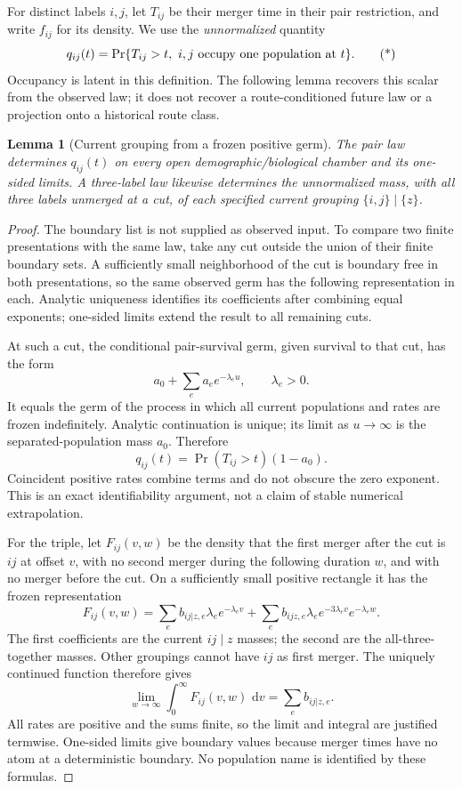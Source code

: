 \documentclass[11pt]{article}
\newtheorem{lemma}[theorem]{Lemma}
\newcommand{\dd}{\,\mathrm d}
\begin{document}
For distinct labels $i,j$, let $T_{ij}$ be their merger time in their pair
restriction, and write $f_{ij}$ for its density.  We use the
\emph{unnormalized} quantity
\[
 q_{ij}(t)=\Pr\{T_{ij}>t,\ i,j\hbox{ occupy one population at }t\}.
 \tag{*}\label{eq:current-q}
\]
Occupancy is latent in this definition.  The following lemma recovers this
scalar from the observed law; it does not recover a route-conditioned future
law or a projection onto a historical route class.

\begin{lemma}[Current grouping from a frozen positive germ]
\label{lem:frozen-grouping}
The pair law determines $q_{ij}(t)$ on every open demographic/biological
chamber and its one-sided limits.  A three-label law likewise determines the
unnormalized mass, with all three labels unmerged at a cut, of each specified
current grouping $\{i,j\}\mid\{z\}$.
\end{lemma}
\begin{proof}
The boundary list is not supplied as observed input. To compare two finite presentations with the same law, take any cut outside the union of their finite boundary sets. A sufficiently small neighborhood of the cut is boundary free in both presentations, so the same observed germ has the following representation in each. Analytic uniqueness identifies its coefficients after combining equal exponents; one-sided limits extend the result to all remaining cuts.

At such a cut, the conditional pair-survival germ, given survival to that cut, has the form
\[
 a_0+\sum_e a_e e^{-\lambda_e u},\qquad \lambda_e>0.
\]
It equals the germ of the process in which all current populations and rates
are frozen indefinitely.  Analytic continuation is unique; its limit as
$u\to\infty$ is the separated-population mass $a_0$.  Therefore
\[
 q_{ij}(t)=\Pr(T_{ij}>t)(1-a_0).
\]
Coincident positive rates
combine terms and do not obscure the zero exponent.  This is an exact
identifiability argument, not a claim of stable numerical extrapolation.

For the triple, let $F_{ij}(v,w)$ be the density that the first merger after
the cut is $ij$ at offset $v$, with no second merger during the following
duration $w$, and with no merger before the cut.  On a sufficiently small
positive rectangle it has the frozen representation
\[
 F_{ij}(v,w)=\sum_e b_{ij|z,e}\lambda_e e^{-\lambda_e v}
   +\sum_e b_{ijz,e}\lambda_e e^{-3\lambda_e v}e^{-\lambda_e w}.
\]
The first coefficients are the current $ij\mid z$ masses; the second are
the all-three-together masses.  Other groupings cannot have $ij$ as first
merger.  The uniquely continued function therefore gives
\[
 \lim_{w\to\infty}\int_0^\infty F_{ij}(v,w)\,\dd v
   =\sum_e b_{ij|z,e}.
\]
All rates are positive and the sums finite, so the limit and integral are
justified termwise.  One-sided limits give boundary values because merger
times have no atom at a deterministic boundary.  No population name is
identified by these formulas.
\end{proof}
\end{document}
